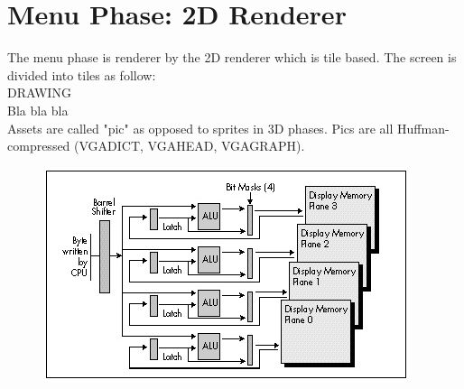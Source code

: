 \section{Menu Phase: 2D Renderer}
The menu phase is renderer by the 2D renderer which is tile based. The screen is divided into tiles as follow:\\
DRAWING\\
Bla bla bla\\
Assets are called "pic" as opposed to sprites in 3D phases. Pics  are all Huffman-compressed (VGADICT, VGAHEAD, 
VGAGRAPH).

 \begin{figure}[H]
\centering
 \includegraphics[width=\textwidth]{imgs/latches_drawing.png}
 \end{figure}
